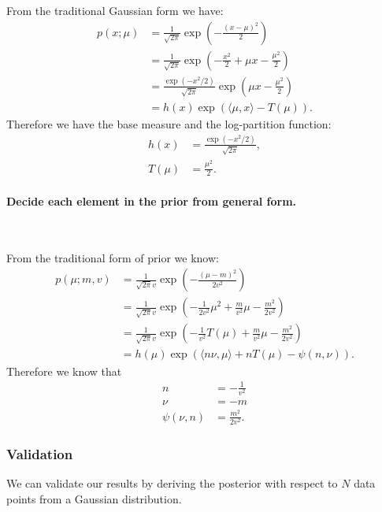 \documentclass[12pt]{article}
\begin{document}
From the traditional Gaussian form we have:
\begin{align*}
    p(x;\mu)&=\frac{1}{\sqrt{2\pi}}\exp\left( -\frac{(x-\mu)^2}{2} \right)\\
    &=\frac{1}{\sqrt{2\pi}}\exp\left( -\frac{x^2}{2}+\mu x-\frac{\mu^2}{2} \right)\\
    &=\frac{\exp\left( -x^2/2 \right)}{\sqrt{2\pi}}\exp\left( \mu x-\frac{\mu^2}{2} \right)\\
    &=h(x)\exp\left( \langle\mu,x\rangle-T(\mu) \right).
\end{align*}
Therefore we have the base measure and the log-partition function:
\begin{align*}
    h(x)&=\frac{\exp(-x^2/2)}{\sqrt{2\pi}},\\
    T(\mu)&=\frac{\mu^2}{2}.
\end{align*}
\newpage
\paragraph{Decide each element in the prior from general form.}~

From the traditional form of prior we know:
\begin{align*}
    p(\mu;m,v)&=\frac{1}{\sqrt{2\pi}v}\exp\left( -\frac{(\mu-m)^2}{2v^2} \right)\\
    &=\frac{1}{\sqrt{2\pi}v}\exp\left( -\frac{1}{2v^2}\mu^2+\frac{m}{v^2}\mu-\frac{m^2}{2v^2} \right)\\
    &=\frac{1}{\sqrt{2\pi}v}\exp\left( -\frac{1}{v^2}T(\mu)+\frac{m}{v^2}\mu-\frac{m^2}{2v^2} \right)\\
    &=h(\mu)\exp\left( \langle n\nu,\mu\rangle+nT(\mu)-\psi(n,\nu) \right).
\end{align*}
Therefore we know that 
\begin{align*}
    n&=-\frac{1}{v^2}\\
    \nu&=-m\\
    \psi(\nu,n)&=\frac{m^2}{2v^2}.
\end{align*}

\subsubsection*{Validation}
We can validate our results by deriving the posterior with respect to $N$ data points from a Gaussian distribution.
\end{document}
